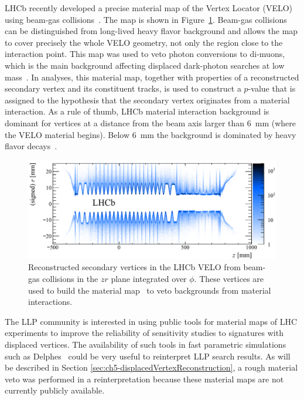 LHCb recently developed a precise material map of the Vertex Locator (VELO) using beam-gas collisions~\cite{Alexander:2018png}. The map is shown in Figure~\ref{fig:lhcbmaterialmap}. Beam-gas collisions can be distinguished from long-lived heavy flavor background and allows the map to cover precisely the whole VELO geometry, not only the region close to the interaction point. This map was used to veto photon conversions to di-muons, which is the main background affecting displaced dark-photon searches at low mass~\cite{Aaij:2017rft}.
In analyses, this material map, together with properties of a reconstructed secondary vertex and its constituent tracks, is used to construct a $p$-value that is assigned to the hypothesis that the secondary vertex originates from a material interaction. As a rule of thumb, LHCb material interaction background is dominant for vertices at a distance from the beam axis larger than 6~mm (where the VELO material begins). Below 6~mm the background is dominated by heavy flavor decays~\cite{Ilten:2016tkc}.

\begin{figure}[t]
  \centering
  \includegraphics[width=\textwidth]{figures/lhcbmaterial.pdf}
  \caption{Reconstructed secondary vertices in the LHCb VELO from beam-gas collisions in the $zr$ plane integrated over $\phi$. These vertices are used to build the material map~\cite{Alexander:2018png} to veto backgrounds from material interactions.
  }
  \label{fig:lhcbmaterialmap}
\end{figure}


The LLP community is interested in using public tools for material maps of LHC experiments to improve the reliability of sensitivity studies to signatures with displaced vertices. The availability of such tools in fast parametric simulations such as Delphes~\cite{deFavereau:2013fsa} could be very useful to reinterpret LLP search results. As will be described in Section \ref{sec:ch5-displacedVertexReconstruction}, a rough material veto was performed in a reinterpretation because these material maps are not currently publicly available.

